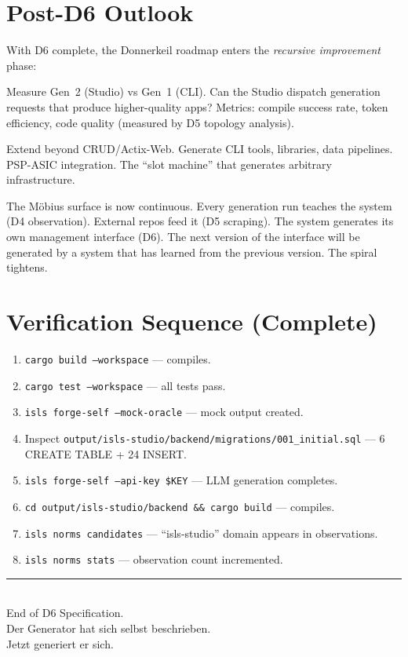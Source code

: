 \documentclass[11pt,a4paper]{article}
\begin{document}
\section{Post-D6 Outlook}

With D6 complete, the Donnerkeil roadmap enters the \emph{recursive
improvement} phase:

\begin{description}[nosep]
\item[D7 --- Generationsspirale:] Measure Gen~2 (Studio) vs Gen~1
  (CLI). Can the Studio dispatch generation requests that produce
  higher-quality apps? Metrics: compile success rate, token efficiency,
  code quality (measured by D5 topology analysis).
\item[D8 --- Offener Horizont:] Extend beyond CRUD/Actix-Web. Generate
  CLI tools, libraries, data pipelines. PSP-ASIC integration.
  The ``slot machine'' that generates arbitrary infrastructure.
\end{description}

The M\"obius surface is now continuous. Every generation run teaches
the system (D4 observation). External repos feed it (D5 scraping).
The system generates its own management interface (D6). The next
version of the interface will be generated by a system that has
learned from the previous version. The spiral tightens.


\section{Verification Sequence (Complete)}
\label{sec:verification}

\begin{enumerate}
\item \texttt{cargo build --workspace} --- compiles.
\item \texttt{cargo test --workspace} --- all tests pass.
\item \texttt{isls forge-self --mock-oracle} --- mock output created.
\item Inspect \texttt{output/isls-studio/backend/migrations/001\_initial.sql}
      --- 6 CREATE TABLE + 24 INSERT.
\item \texttt{isls forge-self --api-key \$KEY} --- LLM generation
      completes.
\item \texttt{cd output/isls-studio/backend \&\& cargo build}
      --- compiles.
\item \texttt{isls norms candidates} --- ``isls-studio'' domain
      appears in observations.
\item \texttt{isls norms stats} --- observation count incremented.
\end{enumerate}

\vfill
\begin{center}
\color{isls-gray}\rule{0.5\textwidth}{0.4pt}\\[0.5em]
{\small End of D6 Specification.\\[0.3em]
Der Generator hat sich selbst beschrieben.\\
Jetzt generiert er sich.}
\end{center}
\end{document}
